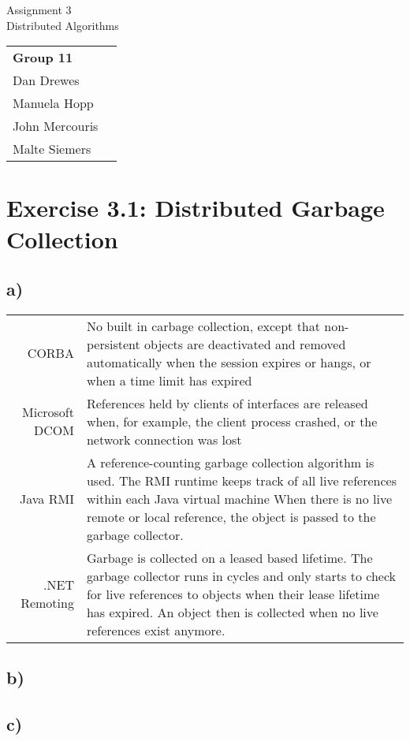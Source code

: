 \documentclass[12pt,a4paper]{article}
\begin{document}
\begin{center}
  \Large Assignment 3 \\
  \large Distributed Algorithms
\end{center}
\begin{flushright}
  \begin{tabular}{ll}
    \textbf{Group 11} \\
    Dan Drewes        \\ 
    Manuela Hopp      \\ 
    John Mercouris    \\
    Malte Siemers     \\
  \end{tabular} 
\end{flushright}

\section*{Exercise 3.1: Distributed Garbage Collection}
\subsection*{a)}
\begin{tabular}{r|p{10cm}}
CORBA & No built in carbage collection, except that non-persistent objects are deactivated and removed automatically when the
session expires or hangs, or when a time limit has expired \\[0.2cm]
Microsoft DCOM & References held by clients of interfaces are released when, for example, the client process crashed, or the
network connection was lost \\[0.2cm]
Java RMI & A reference-counting garbage collection algorithm is used. The RMI runtime keeps track of all live references within
each Java virtual machine When there is no live remote or local reference, the object is passed to the garbage collector.\\[0.2cm]
.NET Remoting & Garbage is collected on a leased based lifetime. The garbage collector runs in cycles and only starts to check for
live references to objects when their lease lifetime has expired. An object then is collected when no live references exist
anymore.
\end{tabular}

\subsection*{b)}
\subsection*{c)}
\end{document}
